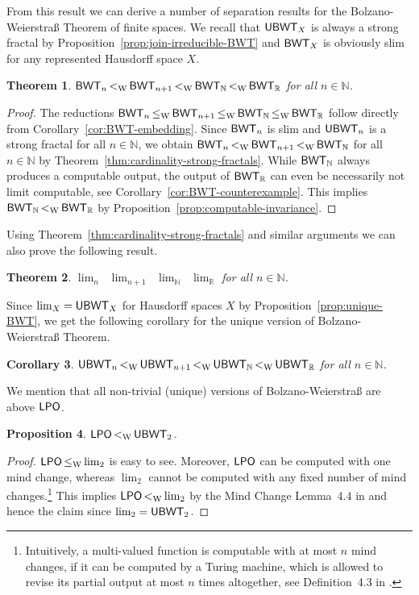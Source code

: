 \documentclass[a4paper]{amsart}
\def\IN{{\mathbb{N}}}
\def\IR{{\mathbb{R}}}
\def\LPO{\text{\rm\sffamily LPO}}
\def\BWT{\text{\rm\sffamily BWT}}
\def\LPO{\mbox{\rm\sffamily LPO}}
\def\UBWT{\text{\rm\sffamily UBWT}}
\def\leqW{\mathop{\leq_{\mathrm{W}}}}
\def\lW{\mathop{<_{\mathrm{W}}}}
\newtheorem{theorem}{Theorem}[section]
\newtheorem{proposition}[theorem]{Proposition}
\newtheorem{corollary}[theorem]{Corollary}
\theoremstyle{definition}
\begin{document}
From this result we can derive a number of separation results for the Bolzano-Weierstra\ss{} Theorem
of finite spaces. We recall that $\UBWT_X$ is always a strong fractal by Proposition~\ref{prop:join-irreducible-BWT}
and $\BWT_X$ is obviously slim for any represented Hausdorff space $X$.

\begin{theorem}
\label{thm:BWT-finite}
$\BWT_n\lW\BWT_{n+1}\lW\BWT_\IN\lW\BWT_\IR$ for all $n\in\IN$.
\end{theorem}
\begin{proof}
The reductions $\BWT_n\leqW\BWT_{n+1}\leqW\BWT_\IN\leqW\BWT_\IR$ follow 
directly from Corollary~\ref{cor:BWT-embedding}.
Since $\BWT_n$ is slim and $\UBWT_n$ is a strong fractal for all $n\in\IN$,
we obtain $\BWT_n\lW\BWT_{n+1}\lW\BWT_\IN$ for all $n\in\IN$ by Theorem~\ref{thm:cardinality-strong-fractals}.
While $\BWT_\IN$ always produces a computable output, the output of $\BWT_\IR$
can even be necessarily not limit computable, see Corollary~\ref{cor:BWT-counterexample}.
This implies $\BWT_\IN\lW\BWT_\IR$ by Proposition~\ref{prop:computable-invariance}.
\end{proof}

Using Theorem~\ref{thm:cardinality-strong-fractals} and similar arguments
we can also prove the following result.

\begin{theorem}
$\lim_n\lW\lim_{n+1}\lW\lim_\IN\lW\lim_\IR$ for all $n\in\IN$.
\end{theorem}

Since $\lim_X=\UBWT_X$ for Hausdorff spaces $X$ by Proposition~\ref{prop:unique-BWT}, 
we get the following corollary for the unique version of Bolzano-Weierstra\ss{} Theorem.

\begin{corollary}
$\UBWT_n\lW\UBWT_{n+1}\lW\UBWT_\IN\lW\UBWT_\IR$ for all $n\in\IN$.
\end{corollary}

We mention that all non-trivial (unique) versions of Bolzano-Weierstra\ss{} are above $\LPO$.

\begin{proposition}
$\LPO\lW\UBWT_2$. 
\end{proposition}
\begin{proof}
$\LPO\leqW\lim_2$ is easy to see. Moreover, $\LPO$ can be computed with one mind change,
whereas $\lim_2$ cannot be computed with any fixed number of mind changes.\footnote{Intuitively, a multi-valued function
is computable with at most $n$ mind changes, if it can be computed by a Turing machine, which is allowed
to revise its partial output at most $n$ times altogether, see Definition~4.3 in \cite{BG11a}.}
This implies $\LPO\lW\lim_2$ by the Mind Change Lemma~4.4 in \cite{BG11a}
and hence the claim since $\lim_2=\UBWT_2$. 
\end{proof}
\end{document}
